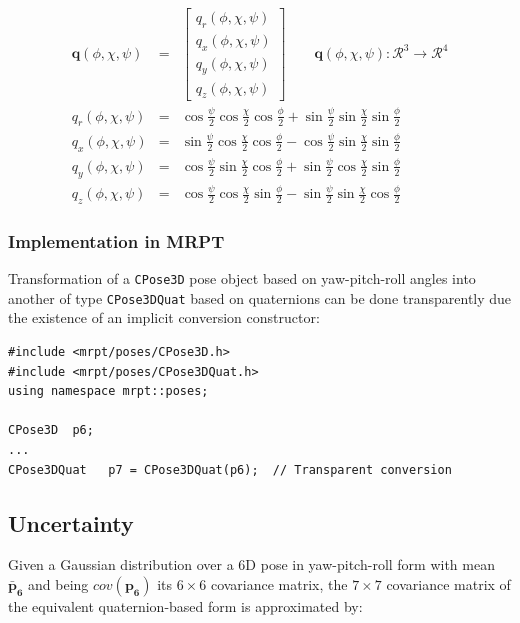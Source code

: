 \documentclass[a4paper,11pt]{report}
\begin{document}
\begin{eqnarray}
 \mathbf{q}(\phi,\chi,\psi) &=& 
 \begin{bmatrix} 
	 q_r(\phi,\chi,\psi) \\
	 q_x(\phi,\chi,\psi) \\
	 q_y(\phi,\chi,\psi) \\
	 q_z(\phi,\chi,\psi)
 \end{bmatrix}
 \quad \quad 
 \mathbf{q}(\phi,\chi,\psi) : \mathcal{R}^3 \rightarrow \mathcal{R}^4
\\
  q_r(\phi,\chi,\psi) &=& \cos\frac{\psi}{2} \cos\frac{\chi}{2}  \cos\frac{\phi}{2}  +
  \sin\frac{\psi}{2} \sin\frac{\chi}{2} \sin\frac{\phi}{2}    \\
  q_x(\phi,\chi,\psi) &=& \sin\frac{\psi}{2} \cos\frac{\chi}{2}  \cos\frac{\phi}{2}  -
  \cos\frac{\psi}{2} \sin\frac{\chi}{2} \sin\frac{\phi}{2}    \\
  q_y(\phi,\chi,\psi) &=& \cos\frac{\psi}{2} \sin\frac{\chi}{2}  \cos\frac{\phi}{2}  +
  \sin\frac{\psi}{2} \cos\frac{\chi}{2} \sin\frac{\phi}{2}    \\
  q_z(\phi,\chi,\psi) &=& \cos\frac{\psi}{2} \cos\frac{\chi}{2}  \sin\frac{\phi}{2}  -
  \sin\frac{\psi}{2} \sin\frac{\chi}{2} \cos\frac{\phi}{2}
\end{eqnarray}


\subsubsection{Implementation in MRPT}

Transformation of a \texttt{CPose3D} pose object based on yaw-pitch-roll angles
into another of type \texttt{CPose3DQuat} based on quaternions can be done transparently
due the existence of an implicit conversion constructor:

\begin{lstlisting}
#include <mrpt/poses/CPose3D.h>
#include <mrpt/poses/CPose3DQuat.h>
using namespace mrpt::poses;

CPose3D  p6;
...
CPose3DQuat   p7 = CPose3DQuat(p6);  // Transparent conversion
\end{lstlisting}


\subsection{Uncertainty}

Given a Gaussian distribution over a 6D pose in yaw-pitch-roll form with
mean ${\mathbf{\bar{p}_6}}$ and being  $cov(\mathbf{p_6})$ its $6 \times 6$ covariance matrix,
the $7 \times 7$ covariance matrix of the equivalent quaternion-based form
is approximated by:
\end{document}
